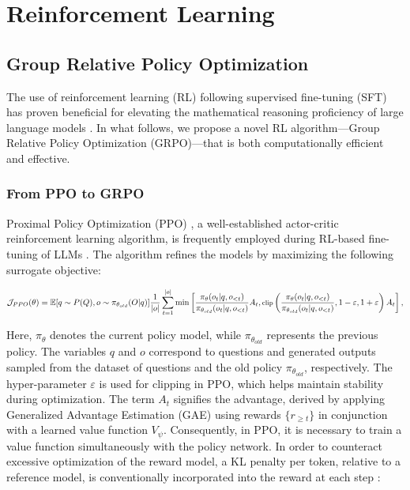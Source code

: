 \section{Reinforcement Learning}

\subsection{Group Relative Policy Optimization} The use of reinforcement learning (RL) following supervised fine-tuning (SFT) has proven beneficial for elevating the mathematical reasoning proficiency of large language models \citep{wang2023math,wizardmath}. In what follows, we propose a novel RL algorithm—Group Relative Policy Optimization (GRPO)—that is both computationally efficient and effective.

\subsubsection{From PPO to GRPO} Proximal Policy Optimization (PPO) \citep{schulman2017proximal}, a well-established actor-critic reinforcement learning algorithm, is frequently employed during RL-based fine-tuning of LLMs \citep{ouyang2022training}. The algorithm refines the models by maximizing the following surrogate objective:

\begin{equation}
\footnotesize
        \mathcal{J}_{PPO}(\theta) = \mathbb{E}{[q \sim P(Q), o \sim \pi_{\theta_{old}}(O|q)]} \frac{1}{|o|} \sum_{t=1}^{|o|} \min \left[ \frac{\pi_\theta(o_{t} | q, o_{<t})}{\pi_{\theta_{old}}(o_{t} | q, o_{<t})} A_{t}, \text{clip} \left( \frac{\pi_\theta(o_{t} | q, o_{<t})}{\pi_{\theta_{old}}(o_{t} | q, o_{<t})}, 1 - \varepsilon, 1 + \varepsilon \right)  A_{t} \right] ,
\end{equation}

Here, $\pi_{\theta}$ denotes the current policy model, while $\pi_{\theta_{old}}$ represents the previous policy. The variables $q$ and $o$ correspond to questions and generated outputs sampled from the dataset of questions and the old policy $\pi_{\theta_{old}}$, respectively. The hyper-parameter $\varepsilon$ is used for clipping in PPO, which helps maintain stability during optimization. The term $A_t$ signifies the advantage, derived by applying Generalized Advantage Estimation (GAE) \citep{gae} using rewards $\{r_{\ge t}\}$ in conjunction with a learned value function $V_{\psi}$. Consequently, in PPO, it is necessary to train a value function simultaneously with the policy network. In order to counteract excessive optimization of the reward model, a KL penalty per token, relative to a reference model, is conventionally incorporated into the reward at each step \citep{ouyang2022training}:

